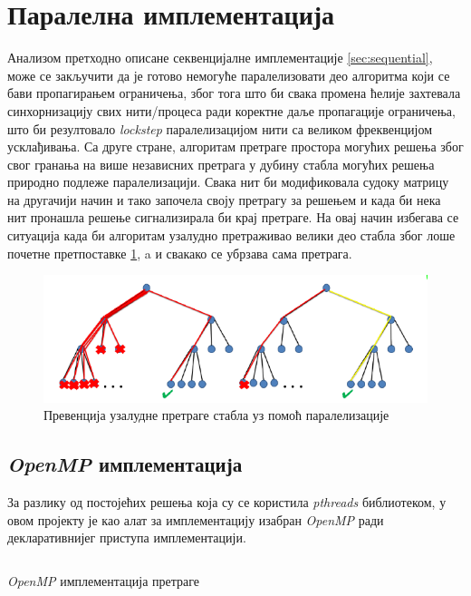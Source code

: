 \section{Паралелна имплементација}\label{sec:parallel}

Анализом претходно описане секвенцијалне имплементације \ref{sec:sequential}, може се закључити да је готово немогуће паралелизовати део алгоритма који се бави пропагирањем ограничења, због тога што би свака промена ћелије захтевала синхорнизацију свих нити/процеса ради коректне даље пропагације ограничења, што би резултовало \textit{lockstep} паралелизацијом нити са великом фреквенцијом усклађивања. Са друге стране, алгоритам претраге простора могућих решења због свог  гранања на више независних претрага у дубину стабла могућих решења природно подлеже паралелизацији. Свака нит би модификовала судоку матрицу на другачији начин и тако започела своју претрагу за решењем и када би нека нит пронашла решење сигнализирала би крај претраге. На овај начин избегава се ситуација када би алгоритам узалудно претраживао велики део стабла због лоше почетне претпоставке \ref{fig:search_parallel}, a и свакако се убрзава сама претрага.

\begin{figure}[H]
    \centering
    \includegraphics[width=1\textwidth]{images/search_parallel.png}
    \caption{Превенција узалудне претраге стабла уз помоћ паралелизације}
    \label{fig:search_parallel}
\end{figure}

\subsection{\textit{OpenMP} имплементација}\label{sec:mp_impl}

За разлику од постојећих решења која су се користила \textit{pthreads} \cite{pthreads} библиотеком, у овом пројекту је као алат за имплементацију изабран \textit{OpenMP} \cite{open_mp} ради декларативнијег приступа имплементацији.


\begin{listing}[H]
\inputminted{c}{kodovi/mp_search.c}
\caption{\textit{OpenMP} имплементација претраге}
\label{code:mp_search}
\end{listing}

